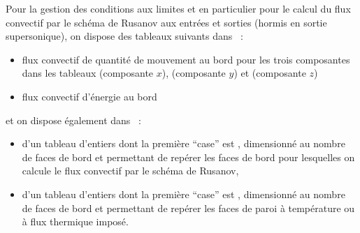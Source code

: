 \bigskip
Pour la gestion des conditions aux limites et en particulier pour le calcul du
flux convectif par le sch\'ema de Rusanov
aux entr\'ees et sorties (hormis en sortie supersonique), on
dispose des tableaux suivants dans  ~:
\begin{itemize}
\item flux convectif de quantit\'e de mouvement au bord pour les trois
composantes dans les tableaux
 (composante $x$),
 (composante $y$) et
 (composante $z$)
\item flux convectif d'\'energie au bord
\end{itemize}
et on dispose \'egalement dans ~:
\begin{itemize}
\item d'un tableau d'entiers dont la premi\`ere ``case'' est , dimensionn\'e au nombre de faces de bord
et permettant de rep\'erer les faces de bord pour lesquelles on calcule
le flux convectif par le sch\'ema de Rusanov,
\item d'un tableau  d'entiers dont la premi\`ere ``case'' est , dimensionn\'e au nombre de faces de bord
et permettant de rep\'erer les faces de paroi \`a temp\'erature ou \`a flux
thermique impos\'e.
\end{itemize}



\newpage

